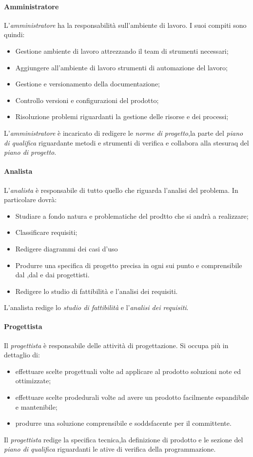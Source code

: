		\paragraph{Amministratore}
		L'\textit{amministratore} ha la responsabilità sull'ambiente di lavoro.
		I suoi compiti sono quindi:
		\begin{itemize}
			\item Gestione ambiente di lavoro attrezzando il team di strumenti necessari;
			\item Aggiungere all'ambiente di lavoro strumenti di automazione del lavoro;
			\item Gestione e versionamento della documentazione;
			\item Controllo versioni e configurazioni del prodotto;
			\item Risoluzione problemi riguardanti la gestione delle risorse e dei processi;
		\end{itemize}
		L'\textit{amministratore} è incaricato di redigere le \textit{norme di progetto},la parte del \textit{piano di qualifica} riguardante metodi e strumenti di verifica e collabora alla stesuraq del \textit{piano di progetto}.
		\paragraph{Analista}
		L'\textit{analista} è responsabile di tutto quello che riguarda l'analisi del problema.
		In particolare dovrà:
		\begin{itemize}
			\item Studiare a fondo natura e problematiche del prodtto che si andrà a realizzare;
			\item Classificare requisiti;
			\item Redigere diagrammi dei casi d'uso
			\item Produrre una specifica di progetto precisa in ogni sui punto e comprensibile dal ,dal  e dai progettisti.
			\item Redigere lo studio di fattibilità e l'analisi dei requisiti.
		\end{itemize}
		L'analista redige lo \textit{studio di fattibilità} e l'\textit{analisi dei requisiti}.
		\paragraph{Progettista}
		Il \textit{progettista} è responsabile delle attività di progettazione. Si occupa più in dettaglio di:
		\begin{itemize}
			\item effettuare scelte progettuali volte ad applicare al prodotto soluzioni note ed ottimizzate;
			\item effettuare scelte prodedurali volte ad avere un prodotto facilmente espandibile e mantenibile;
			\item produrre una soluzione comprensibile e soddsfacente per il committente.
		\end{itemize}
		Il \textit{progettista} redige la specifica tecnica,la definizione di prodotto e le sezione del \textit{piano di qualifica} riguardanti le  ative di verifica della programmazione.
